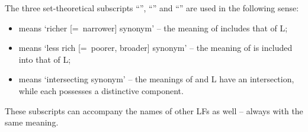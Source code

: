 The three set-theoretical subscripts ``\tsub{$\supset$}'', ``\tsub{$\subset$}'' and ``\tsub{$\cap$}'' are used in the following sense:

\begin{itemize}

\item {} means `richer [=~narrower] synonym' -- the meaning of  includes that of L;

\item {} means `less rich [=~poorer, broader] synonym' -- the meaning of  is included into that of L;

\item {} means `intersecting synonym' -- the meanings of  and L have an intersection, while each possesses a distinctive component.

\end{itemize}

These subscripts can accompany the names of other LFs as well -- always with the same meaning.

